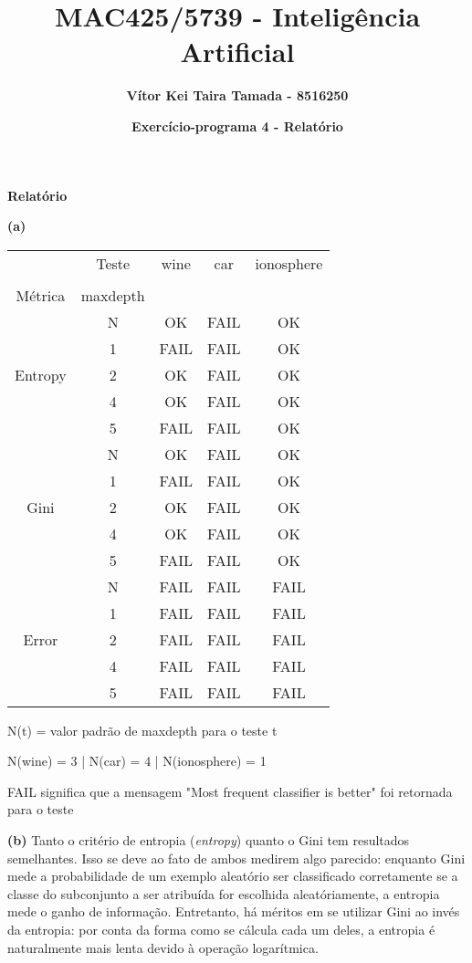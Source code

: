 \documentclass{article}
\title{\textbf{MAC425/5739 - Inteligência Artificial}}
\author{\textbf{Vítor Kei Taira Tamada - 8516250}}
\date{\textbf{Exercício-programa 4 - Relatório}}
\begin{document}
\maketitle

\textbf{\LARGE{Relatório}}

\quad \textbf{(a)}

\begin{center}
	\begin{tabular}{| c  c | c | c | c |}
		\hline
			& Teste & wine & car & ionosphere \\ 
			& & & & \\
			Métrica & maxdepth & & & \\ \hline
			
			& N & OK & FAIL & OK \\
			& 1 & FAIL & FAIL & OK \\
			Entropy & 2 & OK & FAIL & OK \\
			& 4 & OK & FAIL & OK \\
			& 5 & FAIL & FAIL & OK \\ \hline
			
			& N & OK & FAIL & OK \\
			& 1 & FAIL & FAIL & OK \\
			Gini & 2 & OK & FAIL & OK \\
			& 4 & OK & FAIL & OK \\
			& 5 & FAIL & FAIL & OK \\ \hline
			
			& N & FAIL & FAIL & FAIL \\
			& 1 & FAIL & FAIL & FAIL \\
			Error & 2 & FAIL & FAIL & FAIL \\
			& 4 & FAIL & FAIL & FAIL \\
			& 5 & FAIL & FAIL & FAIL \\ \hline
	\end{tabular}
	
	N(t) = valor padrão de maxdepth para o teste t
	
	N(wine) = 3 | N(car) = 4 | N(ionosphere) = 1
	
	\bigskip
	FAIL significa que a mensagem "Most frequent classifier is better" foi retornada para o teste
\end{center}

\bigskip
\quad \textbf{(b)} Tanto o critério de entropia (\textit{entropy}) quanto o Gini tem resultados semelhantes. Isso se deve ao fato de ambos medirem algo parecido: enquanto Gini mede a probabilidade de um exemplo aleatório ser classificado corretamente se a classe do subconjunto a ser atribuída for escolhida aleatóriamente, a entropia mede o ganho de informação. Entretanto, há méritos em se utilizar Gini ao invés da entropia: por conta da forma como se cálcula cada um deles, a entropia é naturalmente mais lenta devido à operação logarítmica.
\end{document}
